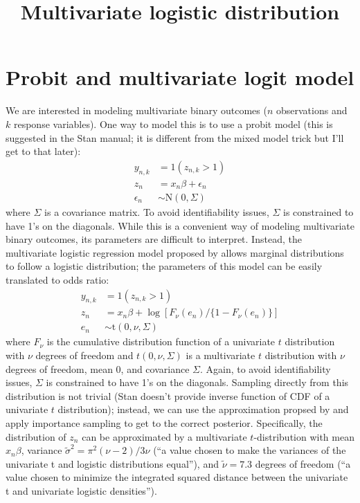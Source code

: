 \documentclass{article}\usepackage[]{graphicx}\usepackage[]{color}
\title{Multivariate logistic distribution}
\begin{document}
\maketitle

\section{Probit and multivariate logit model}

We are interested in modeling multivariate binary outcomes ($n$ observations and $k$ response variables). 
One way to model this is to use a probit model (this is suggested in the Stan manual; it is different from the mixed model trick but I'll get to that later):
\begin{equation}
\begin{aligned}
y_{n,k} &= 1(z_{n,k} > 1)\\
z_{n} &= x_n \beta + \epsilon_{n}\\
\epsilon_{n} &\sim \mathrm{N}(0, \Sigma)
\end{aligned}
\end{equation}
where $\Sigma$ is a covariance matrix. 
To avoid identifiability issues, $\Sigma$ is constrained to have 1's on the diagonals.
While this is a convenient way of modeling multivariate binary outcomes, its parameters are difficult to interpret. Instead, the multivariate logistic regression model proposed by \cite{o2004bayesian} allows marginal distributions to follow a logistic distribution; the parameters of this model can be easily translated to odds ratio:
\begin{equation}
\begin{aligned}
y_{n,k} &= 1(z_{n,k} > 1)\\
z_{n} &= x_n \beta + \log[F_\nu(e_n)/\{1 - F_\nu(e_n)\}]\\
e_n &\sim \mathrm{t}(0, \nu, \Sigma)
\end{aligned}
\end{equation}
where $F_\nu$ is the cumulative distribution function of a univariate $t$ distribution with $\nu$ degrees of freedom and $t(0, \nu, \Sigma)$ is a multivariate $t$ distribution with $\nu$ degrees of freedom, mean 0, and covariance $\Sigma$.
Again, to avoid identifiability issues, $\Sigma$ is constrained to have 1's on the diagonals.
Sampling directly from this distribution is not trivial (Stan doesn't provide inverse function of CDF of a univariate $t$ distribution); instead, we can use the approximation propsed by \cite{o2004bayesian} and apply importance sampling to get to the correct posterior. 
Specifically, the distribution of $z_n$ can be approximated by a multivariate $t$-distribution with mean $x_n\beta$, variance $\tilde \sigma^2 = \pi^2 (\nu - 2)/3 \nu$ (``a value chosen to make the variances of the univariate t and logistic distributions equal''), and $\tilde \nu = 7.3$ degrees of freedom (``a value chosen to minimize the integrated squared distance between the univariate t and univariate logistic densities'').
\end{document}
